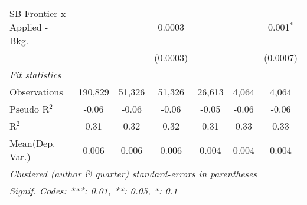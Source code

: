 \begin{tabular}{lcccccc}
   SB Frontier x Applied - Bkg.   &                &               & 0.0003         &                &                & 0.001$^{*}$\\   
                                  &                &               & (0.0003)       &                &                & (0.0007)\\   
   \midrule
   \emph{Fit statistics}\\
   Observations                   & 190,829        & 51,326        & 51,326         & 26,613         & 4,064          & 4,064\\  
   Pseudo R$^2$                   & -0.06          & -0.06         & -0.06          & -0.05          & -0.06          & -0.06\\  
   R$^2$                          & 0.31           & 0.32          & 0.32           & 0.31           & 0.33           & 0.33\\  
Mean(Dep. Var.) & 0.006 & 0.006 & 0.006 & 0.004 & 0.004 & 0.004 \\
   \midrule \midrule
   \multicolumn{7}{l}{\emph{Clustered (author \& quarter) standard-errors in parentheses}}\\
   \multicolumn{7}{l}{\emph{Signif. Codes: ***: 0.01, **: 0.05, *: 0.1}}\\
\end{tabular}
\par\endgroup
